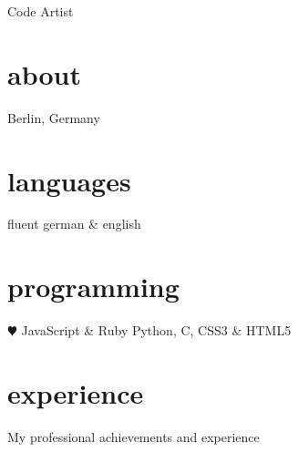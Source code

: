 \documentclass[]{friggeri-cv}
\begin{document}
       {Code Artist}


\begin{aside}
  \section{about}
    Berlin, Germany
    ~
  \section{languages}
    fluent german \& english
  \section{programming}
    {\color{red} $\varheartsuit$} JavaScript \& Ruby
    Python, C,
    CSS3 \& HTML5
\end{aside}


\section{experience}
My professional achievements and experience
\end{document}

